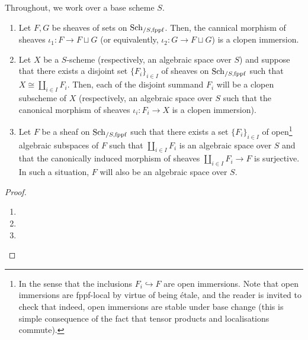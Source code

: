             \begin{lemma} \label{lemma: representability_by_schemes_and_algebraic_spaces_of_disjoint_summands}
                Throughout, we work over a base scheme $S$.
                \begin{enumerate}
                    \item Let $F, G$ be sheaves of sets on $\mathrm{Sch}_{/S, \mathrm{fppf}}$. Then, the cannical morphism of sheaves $\iota_1: F \to F \sqcup G$ (or equivalently, $\iota_2: G \to F \sqcup G$) is a clopen immersion.
                    \item Let $X$ be a $S$-scheme (respectively, an algebraic space over $S$) and suppose that there exists a disjoint set $\{F_i\}_{i \in I}$ of sheaves on $\mathrm{Sch}_{/S, \mathrm{fppf}}$ such that $X \cong \coprod_{i \in I} F_i$. Then, each of the disjoint summand $F_i$ will be a clopen subscheme of $X$ (respectively, an algebraic space over $S$ such that the canonical morphism of sheaves $\iota_i: F_i \to X$ is a clopen immersion).
                    \item Let $F$ be a sheaf on $\mathrm{Sch}_{/S, \mathrm{fppf}}$ such that there exists a set $\{F_i\}_{i \in I}$ of open\footnote{In the sense that the inclusions $F_i \hookrightarrow F$ are open immersions. Note that open immersions are fppf-local by virtue of being \'etale, and the reader is invited to check that indeed, open immersions are stable under base change (this is simple consequence of the fact that tensor products and localisations commute).} algebraic subspaces of $F$ such that $\coprod_{i \in I} F_i$ is an algebraic space over $S$ and that the canonically induced morphism of sheaves $\coprod_{i \in I} F_i \to F$ is surjective. In such a situation, $F$ will also be an algebraic space over $S$.
                \end{enumerate}
            \end{lemma}
                \begin{proof}
                    \noindent
                    \begin{enumerate}
                        \item 
                        \item 
                        \item 
                    \end{enumerate}
                \end{proof}
                
